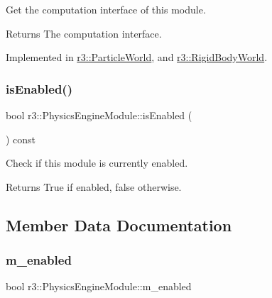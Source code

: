 Get the computation interface of this module. 

\begin{DoxyReturn}{Returns}
The computation interface. 
\end{DoxyReturn}


Implemented in \mbox{\hyperlink{classr3_1_1_particle_world_a1e806bf89ec6445a54b9534f1efc081f}{r3\+::\+Particle\+World}}, and \mbox{\hyperlink{classr3_1_1_rigid_body_world_ac25b39a5b15666d99f42b68f29f8a97b}{r3\+::\+Rigid\+Body\+World}}.

\mbox{\label{classr3_1_1_physics_engine_module_add8b93ca3e3e3ec0ff045c15610119ea}} 
\subsubsection{\texorpdfstring{is\+Enabled()}{isEnabled()}}
{\footnotesize\ttfamily bool r3\+::\+Physics\+Engine\+Module\+::is\+Enabled (\begin{DoxyParamCaption}{ }\end{DoxyParamCaption}) const}



Check if this module is currently enabled. 

\begin{DoxyReturn}{Returns}
True if enabled, false otherwise. 
\end{DoxyReturn}


\subsection{Member Data Documentation}
\mbox{\label{classr3_1_1_physics_engine_module_a9697a77e77dc5dd5990b16876ad413bf}} 
\subsubsection{\texorpdfstring{m\+\_\+enabled}{m\_enabled}}
{\footnotesize\ttfamily bool r3\+::\+Physics\+Engine\+Module\+::m\+\_\+enabled\hspace{0.3cm}{\ttfamily [protected]}}




